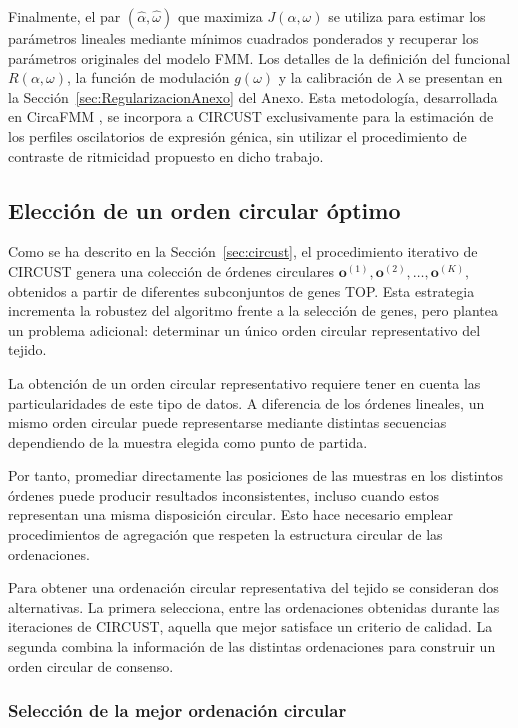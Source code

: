 \documentclass[12pt, a4paper]{report}
\begin{document}
Finalmente, el par \((\widehat{\alpha},\widehat{\omega})\) que maximiza \(J(\alpha,\omega)\) se utiliza para estimar los parámetros lineales mediante mínimos cuadrados ponderados y recuperar los parámetros originales del modelo FMM. Los detalles de la definición del funcional \(R(\alpha,\omega)\), la función de modulación \(g(\omega)\) y la calibración de \(\lambda\) se presentan en la Sección~\ref{sec:RegularizacionAnexo} del Anexo. Esta metodología, desarrollada en CircaFMM \citep{Abston2026CircaFMM}, se incorpora a CIRCUST exclusivamente para la estimación de los perfiles oscilatorios de expresión génica, sin utilizar el procedimiento de contraste de ritmicidad propuesto en dicho trabajo.

\subsection{Elección de un orden circular óptimo}
\label{sec:ordenOptimo}


Como se ha descrito en la Sección~\ref{sec:circust}, el procedimiento iterativo de CIRCUST genera una colección de órdenes circulares
\(
\mathbf{o}^{(1)},\mathbf{o}^{(2)},\ldots,\mathbf{o}^{(K)},
\)
obtenidos a partir de diferentes subconjuntos de genes TOP. Esta estrategia incrementa la robustez del algoritmo frente a la selección de genes, pero plantea un problema adicional: determinar un único orden circular representativo del tejido.

La obtención de un orden circular representativo requiere tener en cuenta las particularidades de este tipo de datos. A diferencia de los órdenes lineales, un mismo orden circular puede representarse mediante distintas secuencias dependiendo de la muestra elegida como punto de partida. 

Por tanto, promediar directamente las posiciones de las muestras en los distintos órdenes puede producir resultados inconsistentes, incluso cuando estos representan una misma disposición circular. Esto hace necesario emplear procedimientos de agregación que respeten la estructura circular de las ordenaciones.

Para obtener una ordenación circular representativa del tejido se consideran dos alternativas. La primera selecciona, entre las ordenaciones obtenidas durante las iteraciones de CIRCUST, aquella que mejor satisface un criterio de calidad. La segunda combina la información de las distintas ordenaciones para construir un orden circular de consenso.

\subsubsection{Selección de la mejor ordenación circular}
\end{document}
